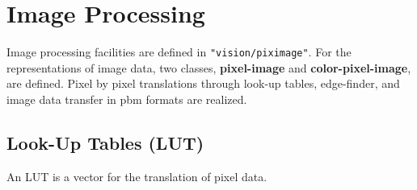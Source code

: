 \section{Image Processing}

Image processing facilities are defined in {\tt "vision/piximage"}.
For the representations of image data, two classes,
{\bf pixel-image} and {\bf color-pixel-image}, are defined.
Pixel by pixel translations through look-up tables,
edge-finder, and image data transfer in pbm formats are realized.

\subsection{Look-Up Tables (LUT)}
An LUT is a vector for the translation of pixel data.

